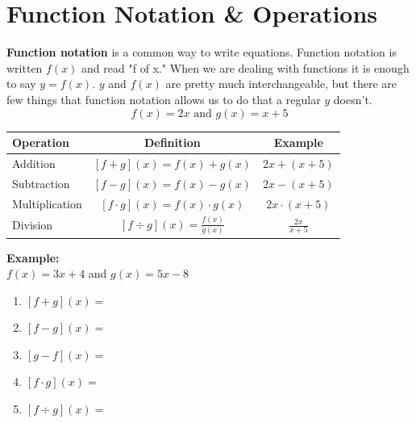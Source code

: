 \documentclass[12pt]{article}
\let\stdsection\section
\renewcommand\section{\newpage\stdsection}
\begin{document}
\section{Function Notation \& Operations}

\textbf{Function notation} is a common way to write equations. Function notation is written $f(x)$ and read "f of x." When we are dealing with functions it is enough to say $y=f(x)$. $y$ and $f(x)$ are pretty much interchangeable, but there are few things that function notation allows us to do that a regular $y$ doesn't.\\

$$f(x)=2x  \text{ and } g(x)=x+5$$

\vspace{12pt}

\begin{center}
\def\arraystretch{2}%
\begin{tabular}{l|c|c}

\textbf{Operation} 		& \textbf{Definition} 				& \textbf{Example} \\ \hline
Addition 		& $[f+g](x) = f(x)+g(x)$	& $2x + (x+5)$ \\ \hline
Subtraction 	& $[f-g](x) = f(x)-g(x)$	& $2x - (x+5)$ \\ \hline
Multiplication 	& $[f \cdot g](x) = f(x) \cdot g(x)$ 	& $2x \cdot (x+5)$ \\ \hline
Division 		& $[f \div g](x) = \frac{f(x)}{g(x)}$ 	& $\frac{2x}{x+5}$ \\ 

\end{tabular}
\end{center}

\hspace{12pt}



\hrulefill

\textbf{Example:}\\ $f(x)=3x+4$ \hspace{.5in} and \hspace{.5in} $g(x)=5x-8$ 

\begin{enumerate}
	\item $[f+g](x)=$\\
	
	\item $[f-g](x)=$\\
	
	\item $[g-f](x)=$\\
	
	\item $[f \cdot g](x)=$\\
	
	\item $[f\div g](x)=$\\
\end{enumerate}
\end{document}
